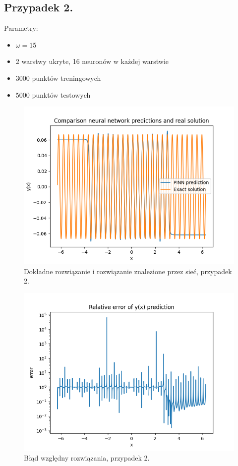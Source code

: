 \documentclass[11pt, leqno]{scrartcl}
\begin{document}
    \subsection{Przypadek 2.}
    Parametry:
    \begin{itemize}
        \item $\omega =15$
        \item 2 warstwy ukryte, 16 neuronów w każdej warstwie
        \item 3000 punktów treningowych
        \item 5000 punktów testowych
    \end{itemize}
    \begin{figure}[H]
        \centering
        \includegraphics[width=0.7\linewidth]{nn_b1_f.png}
        \caption{Dokładne rozwiązanie i rozwiązanie znalezione
            przez sieć, przypadek 2.}
    \end{figure}
    \begin{figure}[H]
        \centering
        \includegraphics[width=0.7\linewidth]{nn_b1_err.png}
        \caption{Błąd względny rozwiązania, przypadek 2.}
    \end{figure}
\end{document}
